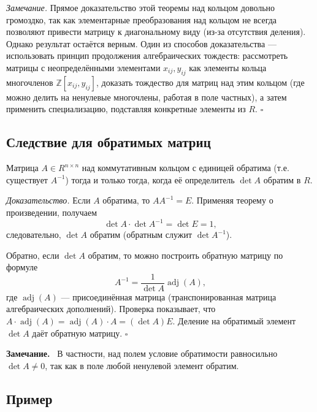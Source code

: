 \documentclass[a4paper,12pt]{article}
\newcommand{\myremark}{\textbf{Замечание.}\ }
\theoremstyle{definition}
\theoremstyle{plain}
\theoremstyle{remark}
\begin{document}
	\medskip
	\textit{Замечание.}
	Прямое доказательство этой теоремы над кольцом довольно громоздко, так как элементарные преобразования над кольцом не всегда позволяют привести матрицу к диагональному виду (из-за отсутствия деления). Однако результат остаётся верным. Один из способов доказательства — использовать принцип продолжения алгебраических тождеств: рассмотреть матрицы с неопределёнными элементами \( x_{ij}, y_{ij} \) как элементы кольца многочленов \( \mathbb{Z}[x_{ij}, y_{ij}] \), доказать тождество для матриц над этим кольцом (где можно делить на ненулевые многочлены, работая в поле частных), а затем применить специализацию, подставляя конкретные элементы из \( R \). \hfill \(\square\)
	
	\subsection{Следствие для обратимых матриц}
	
	\begin{tcolorbox}[colback=red!5, colframe=red!50!black, title=Критерий обратимости]
		Матрица \( A \in R^{n \times n} \) над коммутативным кольцом с единицей обратима (т.е. существует \( A^{-1} \)) тогда и только тогда, когда её определитель \( \det A \) обратим в \( R \).
	\end{tcolorbox}
	
	\medskip
	\textit{Доказательство.}
	Если \( A \) обратима, то \( AA^{-1} = E \). Применяя теорему о произведении, получаем
	\[
	\det A \cdot \det A^{-1} = \det E = 1,
	\]
	следовательно, \( \det A \) обратим (обратным служит \( \det A^{-1} \)).
	
	Обратно, если \( \det A \) обратим, то можно построить обратную матрицу по формуле
	\[
	A^{-1} = \frac{1}{\det A} \operatorname{adj}(A),
	\]
	где \( \operatorname{adj}(A) \) — присоединённая матрица (транспонированная матрица алгебраических дополнений). Проверка показывает, что \( A \cdot \operatorname{adj}(A) = \operatorname{adj}(A) \cdot A = (\det A) E \). Деление на обратимый элемент \( \det A \) даёт обратную матрицу. \hfill \(\square\)
	
	\myremark
	В частности, над полем условие обратимости равносильно \( \det A \neq 0 \), так как в поле любой ненулевой элемент обратим.
	
	\subsection{Пример}
	
\end{document}
